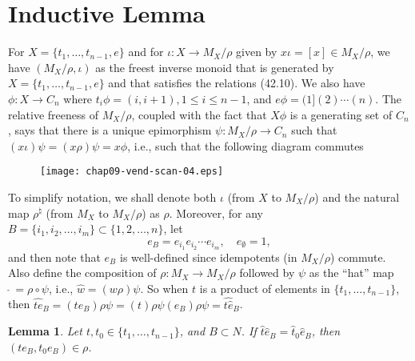 \documentclass{surv-l}
\numberwithin{equation}{section}
\numberwithin{table}{section}
\numberwithin{figure}{section}
\newtheorem{lemma}[equation]{Lemma}
\theoremstyle{definition}
\begin{document}
\section{Inductive Lemma}\label{sec9.44}

For $X =\{t_{1},\ldots, t_{n-1}, e\}$ and for $\iota :
X\rightarrow M_{X}/\rho$ given by $ x\iota =[x]\in  M_{X}/\rho$,
we have $(M_{X}/\rho, \iota)$ as the freest inverse monoid that is
generated by $X=\{t_{1},\ldots, t_{n-1}, e\}$ and that satisfies
the relations (42.10). We also have $\phi : X\rightarrow C_{n}$
where $t_{i}\phi=(i, i+1), 1\leq i\leq n-1$, and
$e\phi=(1](2)\cdots(n)$. The relative freeness of $M_{X}/\rho$,
coupled with the fact that $X\phi$ is a generating set of
$C_{n}$, says that there is a unique epimorphism $\psi :
M_{X}/\rho\rightarrow C_{n}$ such that
$(x\iota)\psi=(x\rho)\psi=x\phi$, i.e., such that the following
diagram commutes
\begin{figure}[!h]
\texttt{[image: chap09-vend-scan-04.eps]}
\end{figure}

\noindent To simplify notation, we shall denote both $\iota$ (from $X$ to
$M_{X}/\rho$) and the natural map $\rho^{\natural}$ (from
$M_{X}$ to $M_{X}/\rho$) as $\rho$. Moreover, for any $B=\{i_{1},
i_{2},\ldots, i_{m}\} \subset\{1,2,\ldots, n\}$, let
\[
e_{B}=e_{i_{1}}e_{i_{2}}\cdots e_{i_{m}},\quad e_{\emptyset}=1,
\]
and then note that $e_{B}$ is well-defined since idempotents (in
$M_{X}/\rho$) commute. Also define the composition of $\rho :
M_{X}\rightarrow M_{X}/\rho$ followed by $\psi$ as the ``hat'' map
$\ \widehat{}\,=\rho \circ\psi$, i.e., $\widehat{w}=(w\rho)\psi$. So
when $t$ is a product of elements in $\{t_{1},\ldots, t_{n-1}\}$,
then $\widehat{te}_{B}=(te_{B})\rho\psi=(t)\rho\psi(e_{B})\rho\psi=\widehat{t\widehat{e}}_{B}$.

\begin{lemma}\label{lem9.44.1}
Let $t, t_{0}\in\{t_{1},\ldots, t_{n-1}\}$, and $B\subset N$. If
$\widehat{t}\widehat{e}_{B}=\widehat{t}_{0}\widehat{e}_{B}$, then
$(te_{B}, t_{0}e_{B})\in\rho$.
\end{lemma}
\end{document}
